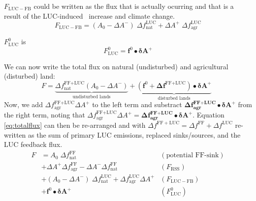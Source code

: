  $F_{\mathrm{LUC-FB}}$ could be written as the flux that is actually ocurring and that is a result of the LUC-induced \coo\ increase and climate change.
\begin{equation}
F_{\mathrm{LUC-FB}} = (A_0-\Delta A^-)\;\Delta f_{\mathrm{nat}}^{\mathrm{LUC}} + \Delta A^+\;\Delta f_{\mathrm{agr}}^{\mathrm{LUC}}
\end{equation}

 $F^0_{\text{LUC}}$ is
\begin{equation}
F^0_{\mathrm{LUC}} = \mathbf{f}^{0} \bullet \mathbf{ \delta A^+}
\end{equation}

We can now write the total flux on natural (undisturbed) and agricultural (disturbed) land:
\begin{equation}
F = \underbrace{\Delta f^{\text{FF+LUC}}_{\text{nat}} (A_0 - \Delta A^-)}_{\text{undisturbed lands}} 
  + \underbrace{(\mathbf{f}^0 + \mathbf{\Delta f}^{\text{FF+LUC}} ) \bullet  \mathbf{\delta A^{+}} }_{\text{disturbed lands}}   \;\,
\label{eq:totalflux}
\end{equation}
Now, we add $\Delta f^{\text{FF+LUC}}_{\text{agr}} \Delta A^+$ to the left term and substract $\mathbf{\Delta f^{\text{FF+LUC}}_{\text{agr}}} \bullet  \mathbf{\delta A^{+}}$ from the right term, noting that $\Delta f^{\text{FF+LUC}}_{\text{agr}} \Delta A^+ = \mathbf{\Delta f^{\text{FF+LUC}}_{\text{agr}}} \bullet  \mathbf{\delta A^{+}}$. Equation \ref{eq:totalflux} can then be re-arranged and with $\Delta f^{\mathrm{FF+LUC}} = \Delta f^{\mathrm{FF}} + \Delta f^{\mathrm{LUC}}$ re-written as the sum of primary LUC emissions, replaced sinks/sources, and the LUC feedback flux.
\begin{align}
F &= A_0 \; \Delta f^{\text{FF}}_{\text{nat}} &(\text{potential FF-sink})\\
  &+ \Delta A^+ \Delta f_{\text{agr}}^{\text{FF}} -  \Delta A^- \Delta f_{\text{nat}}^{\text{FF}} &(F_{\mathrm{RSS}})\\
  &+ (A_0-\Delta A^-)\;\Delta f^{\text{LUC}}_{\text{nat}} + \Delta f^{\text{LUC}}_{\text{agr}} \Delta A^+ &(F_{\mathrm{LUC-FB}})\\
  &+ \mathbf{f}^0\bullet \mathbf{\delta A^+} &(F^0_{\mathrm{LUC}})
\end{align}


